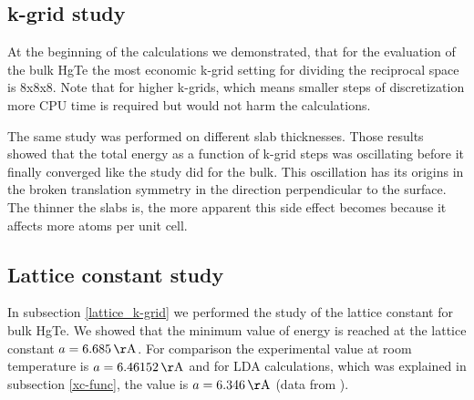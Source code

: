 \subsection{k-grid study}
	At the beginning of the calculations we demonstrated, that for the evaluation of the bulk HgTe the most economic k-grid setting for dividing the reciprocal space is 8x8x8. Note that for higher k-grids, which means smaller steps of discretization more CPU time is required but would not harm the calculations. 
	
	The same study was performed on different slab thicknesses. Those results showed that the total energy as a function of k-grid steps was oscillating before it finally converged like the study did for the bulk. This oscillation has its origins in the broken translation symmetry in the direction perpendicular to the surface. The thinner the slabs is, the more apparent this side effect becomes because it affects more atoms per unit cell. 
%	
\subsection{Lattice constant study}	
	In subsection \ref{lattice_k-grid} we performed the study of the lattice constant for bulk HgTe. We showed that the minimum value of energy is reached at the lattice constant $a= 6.685 \,\unit{\AA}$. For comparison the experimental value at room temperature is $a=6.46152 \,\unit{\AA}$ and for LDA calculations, which was explained in subsection \ref{xc-func}, the value is $a= 6.346 \,\unit{\AA}$ (data from \cite{lattice_constant}).
	
